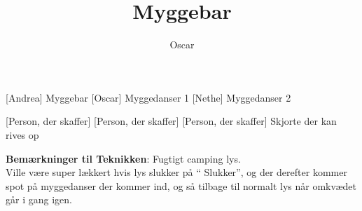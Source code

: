 \documentclass[a4paper,11pt]{article}
\title{Myggebar}
\author{Oscar}
\begin{document}
\maketitle

\begin{roles}
    [Andrea] Myggebar
    [Oscar] Myggedanser 1
    [Nethe] Myggedanser 2
\end{roles}

\begin{props}
    [Person, der skaffer] 
    [Person, der skaffer] 
    [Person, der skaffer] Skjorte der kan rives op 
\end{props}

\textbf{Bemærkninger til Teknikken}: Fugtigt camping lys.\\
Ville være super lækkert hvis lys slukker på “ Slukker”, og der derefter kommer spot på myggedanser der kommer ind, og så tilbage til normalt lys når omkvædet går i gang igen.
\end{document}
